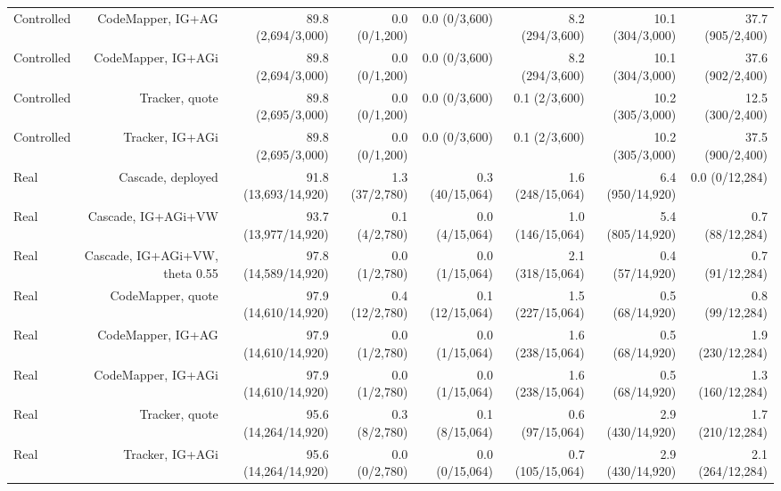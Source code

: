 \begin{table}[t]
{\begin{tabular}{@{}lrrrrrrr@{}}
Controlled & CodeMapper, IG+AG & 89.8 (2,694/3,000) & 0.0 (0/1,200) & 0.0 (0/3,600) & 8.2 (294/3,600) & 10.1 (304/3,000) & 37.7 (905/2,400) \\
Controlled & CodeMapper, IG+AGi & 89.8 (2,694/3,000) & 0.0 (0/1,200) & 0.0 (0/3,600) & 8.2 (294/3,600) & 10.1 (304/3,000) & 37.6 (902/2,400) \\
Controlled & Tracker, quote & 89.8 (2,695/3,000) & 0.0 (0/1,200) & 0.0 (0/3,600) & 0.1 (2/3,600) & 10.2 (305/3,000) & 12.5 (300/2,400) \\
Controlled & Tracker, IG+AGi & 89.8 (2,695/3,000) & 0.0 (0/1,200) & 0.0 (0/3,600) & 0.1 (2/3,600) & 10.2 (305/3,000) & 37.5 (900/2,400) \\
Real & Cascade, deployed & 91.8 (13,693/14,920) & 1.3 (37/2,780) & 0.3 (40/15,064) & 1.6 (248/15,064) & 6.4 (950/14,920) & 0.0 (0/12,284) \\
Real & Cascade, IG+AGi+VW & 93.7 (13,977/14,920) & 0.1 (4/2,780) & 0.0 (4/15,064) & 1.0 (146/15,064) & 5.4 (805/14,920) & 0.7 (88/12,284) \\
Real & Cascade, IG+AGi+VW, theta 0.55 & 97.8 (14,589/14,920) & 0.0 (1/2,780) & 0.0 (1/15,064) & 2.1 (318/15,064) & 0.4 (57/14,920) & 0.7 (91/12,284) \\
Real & CodeMapper, quote & 97.9 (14,610/14,920) & 0.4 (12/2,780) & 0.1 (12/15,064) & 1.5 (227/15,064) & 0.5 (68/14,920) & 0.8 (99/12,284) \\
Real & CodeMapper, IG+AG & 97.9 (14,610/14,920) & 0.0 (1/2,780) & 0.0 (1/15,064) & 1.6 (238/15,064) & 0.5 (68/14,920) & 1.9 (230/12,284) \\
Real & CodeMapper, IG+AGi & 97.9 (14,610/14,920) & 0.0 (1/2,780) & 0.0 (1/15,064) & 1.6 (238/15,064) & 0.5 (68/14,920) & 1.3 (160/12,284) \\
Real & Tracker, quote & 95.6 (14,264/14,920) & 0.3 (8/2,780) & 0.1 (8/15,064) & 0.6 (97/15,064) & 2.9 (430/14,920) & 1.7 (210/12,284) \\
Real & Tracker, IG+AGi & 95.6 (14,264/14,920) & 0.0 (0/2,780) & 0.0 (0/15,064) & 0.7 (105/15,064) & 2.9 (430/14,920) & 2.1 (264/12,284) \\
\bottomrule
\end{tabular}
}
\end{table}

